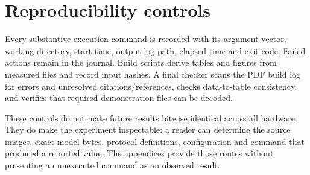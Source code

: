 \ifFullReport
\section{Reproducibility controls}
Every substantive execution command is recorded with its argument vector, working directory, start time, output-log path, elapsed time and exit code. Failed actions remain in the journal. Build scripts derive tables and figures from measured files and record input hashes. A final checker scans the PDF build log for errors and unresolved citations/references, checks data-to-table consistency, and verifies that required demonstration files can be decoded.

These controls do not make future results bitwise identical across all hardware. They do make the experiment inspectable: a reader can determine the source images, exact model bytes, protocol definitions, configuration and command that produced a reported value. The appendices provide those routes without presenting an unexecuted command as an observed result.
\fi

